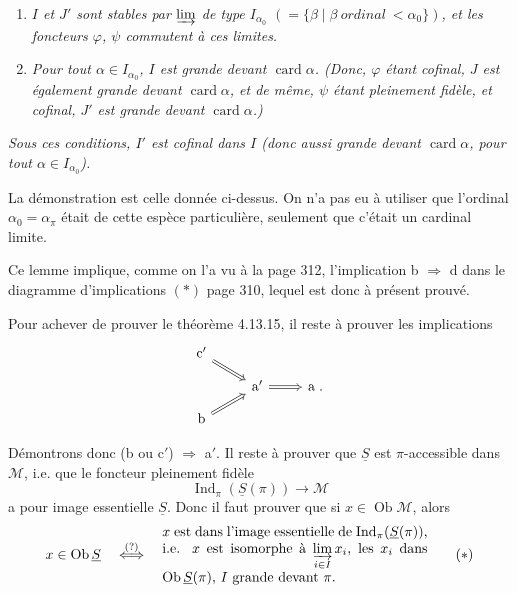 \documentclass[11pt]{article}
\newcommand{\printedpage}[1]{\marginpar{\footnotesize p.~#1}}
\newcommand{\msp}[1]{\marginpar{\footnotesize [#1]}}
\newcommand{\Ob}{\operatorname{Ob}}
\newcommand{\card}{\operatorname{card}}
\DeclareMathOperator{\Ind}{Ind}
\begin{document}
\begin{enumerate}[label={}]
\item[\textit{2)}] \textit{$I$ et $J'$ sont stables par $\varinjlim$ de type $I_{\alpha_0}$ $(= \{\beta \mid \beta \ \textit{ordinal}\ < \alpha_0\})$, et les foncteurs $\varphi$, $\psi$ commutent à ces limites.}
\item[\textit{3)}] \textit{Pour tout $\alpha \in I_{\alpha_0}$, $I$ est grande devant $\card\alpha$. (Donc, $\varphi$ étant cofinal, $J$ est également grande devant $\card\alpha$, et de même, $\psi$ étant pleinement fidèle, et cofinal, $J'$ est grande devant $\card\alpha$.)}
\end{enumerate}

\textit{Sous ces conditions, $I'$ est cofinal dans $I$ (donc aussi grande devant $\card\alpha$, pour tout $\alpha \in I_{\alpha_0}$).}

La démonstration est celle donnée ci-dessus. On n'a pas eu à utiliser que l'ordinal $\alpha_0 = \alpha_\pi$ était de cette espèce particulière, seulement que c'était un cardinal limite.

\printedpage{125}

\msp{page 331}

Ce lemme implique, comme on l'a vu à la page 312, l'implication b $\Longrightarrow$ d dans le diagramme d'implications $(*)$ page 310, lequel est donc à présent prouvé.

Pour achever de prouver le théorème 4.13.15, il reste à prouver les implications
\[
\begin{tikzcd}[row sep=small]
\mathrm{c}' \arrow[dr, Rightarrow] & & \\
& \mathrm{a}' \arrow[r, Rightarrow] & \mathrm{a} \; . \\
\mathrm{b} \arrow[ur, Rightarrow] & &
\end{tikzcd}
\]

Démontrons donc (b ou c$'$) $\Longrightarrow$ a$'$. Il reste à prouver que $\underline{S}$ est $\pi$-accessible dans $\mathcal{M}$, i.e. que le foncteur pleinement fidèle
\[
\Ind_\pi(\underline{S}(\pi)) \longrightarrow \mathcal{M} \tag*{$(*)$}
\]
a pour image essentielle $\underline{S}$. Donc il faut prouver que si $x \in \Ob\mathcal{M}$, alors
\[
x \in \Ob\underline{S} \quad \overset{(?)}{\Longleftrightarrow} \quad
\begin{minipage}[c]{0.55\textwidth}
$x$ est dans l'image essentielle de $\Ind_\pi(\underline{S}(\pi))$, i.e. $x$ est isomorphe à $\varinjlim\limits_{i\in I} x_i$, les $x_i$ dans $\Ob\underline{S}(\pi)$, $I$ grande devant $\pi$.
\end{minipage}
\tag*{$(*)$}
\]
\end{document}
